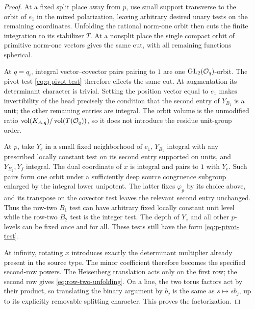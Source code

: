 \begin{proof}
 At a fixed split place away from $p$, use small support transverse to
 the orbit of $e_1$ in the mixed polarization, leaving arbitrary desired
 unary tests on the remaining coordinates.  Unfolding the rational
 norm-one orbit then cuts the finite integration to its stabilizer
 $T$.  At a nonsplit place the single compact orbit of primitive
 norm-one vectors gives the same cut, with all remaining functions
 spherical.

 At $q=q_i$, integral vector--covector pairs pairing to $1$ are one
 $\operatorname{GL}_2(\mathcal O_q)$-orbit.  The pivot test
 \eqref{eq:q-pivot-test} therefore effects the same cut.  At augmentation
 its determinant character is trivial.  Setting the position vector
 equal to $e_1$ makes invertibility of the head precisely the condition
 that the second entry of $Y_{B_1}$ is a unit; the other remaining
 entries are integral.  The orbit volume is the unmodified ratio
 $\operatorname{vol}(K_{A,q})/\operatorname{vol}(T(\mathcal O_q))$, so it does not introduce the residue
 unit-group order.

 At $p$, take $Y_e$ in a small fixed neighborhood of $e_1$,
 $Y_{B_1}$ integral with any prescribed locally constant test on its
 second entry supported on units, and $Y_{B_2},Y_f$ integral.  The dual
 coordinate of $x$ is integral and pairs to $1$ with $Y_e$.
 Such pairs form one orbit under a sufficiently deep source congruence
 subgroup enlarged by the integral lower unipotent.  The latter fixes
 $\varphi_p$ by its choice above, and its transpose on the covector
 test leaves the relevant second entry unchanged.  Thus the row-two
 $B_1$ test can have arbitrary fixed locally constant unit level while
 the row-two $B_2$ test is the integer test.  The depth of $Y_e$ and all
 other $p$-levels can be fixed once and for all.  These tests still have
 the form \eqref{eq:p-pivot-test}.

 At infinity, rotating $x$ introduces exactly the determinant
 multiplier already present in the source type.  The minor coefficient
 therefore becomes the specified second-row powers.  The Heisenberg
 translation acts only on the first row; the second row gives
 \eqref{eq:row-two-unfolding}.  On a line, the two torus factors act by
 their product, so translating the binary argument by $b_j$ is the
 same as $s\mapsto sb_j$, up to its explicitly removable splitting
 character.  This proves the factorization.
\end{proof}

